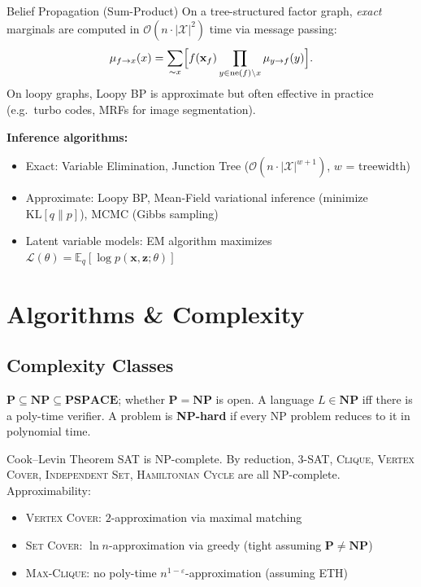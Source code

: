 \documentclass[10pt, letterpaper]{article}
\newcommand{\term}[1]{\textbf{\color{accent}#1}}
\newcommand{\E}{\mathbb{E}}
\newcommand{\Lc}{\mathcal{L}}
\newcommand{\bigO}[1]{\mathcal{O}\!\left(#1\right)}
\begin{document}
\begin{keyresult}{Belief Propagation (Sum-Product)}
On a tree-structured factor graph, \emph{exact} marginals are computed in
$\bigO{n \cdot |\mathcal{X}|^2}$ time via message passing:
\[
  \mu_{f\to x}(x) = \sum_{\sim x}\Bigl[f(\mathbf{x}_f)\prod_{y\in\mathrm{ne}(f)\setminus x}\mu_{y\to f}(y)\Bigr].
\]
On loopy graphs, Loopy BP is approximate but often effective in practice
(e.g.\ turbo codes, MRFs for image segmentation).
\end{keyresult}

\textbf{Inference algorithms:}
\begin{itemize}
  \item Exact: Variable Elimination, Junction Tree ($\bigO{n\cdot|\mathcal{X}|^{w+1}}$,
        $w$ = treewidth)
  \item Approximate: Loopy BP, Mean-Field variational inference (minimize $\mathrm{KL}[q\|p]$),
        MCMC (Gibbs sampling)
  \item Latent variable models: EM algorithm maximizes $\Lc(\theta) = \E_q[\log p(\mathbf{x},\mathbf{z};\theta)]$
\end{itemize}

\section{Algorithms \& Complexity}

\subsection{Complexity Classes}
$\mathbf{P}\subseteq\mathbf{NP}\subseteq\mathbf{PSPACE}$; whether $\mathbf{P}=\mathbf{NP}$
is open. A language $L\in\mathbf{NP}$ iff there is a poly-time verifier. A problem is
\term{NP-hard} if every NP problem reduces to it in polynomial time.

\begin{keyresult}{Cook–Levin Theorem}
\textsc{SAT} is NP-complete. By reduction, \textsc{3-SAT}, \textsc{Clique},
\textsc{Vertex Cover}, \textsc{Independent Set}, \textsc{Hamiltonian Cycle} are
all NP-complete. Approximability:
\begin{itemize}[topsep=1pt]
  \item \textsc{Vertex Cover}: $2$-approximation via maximal matching
  \item \textsc{Set Cover}: $\ln n$-approximation via greedy (tight assuming $\mathbf{P}\ne\mathbf{NP}$)
  \item \textsc{Max-Clique}: no poly-time $n^{1-\varepsilon}$-approximation (assuming ETH)
\end{itemize}
\end{keyresult}
\end{document}
